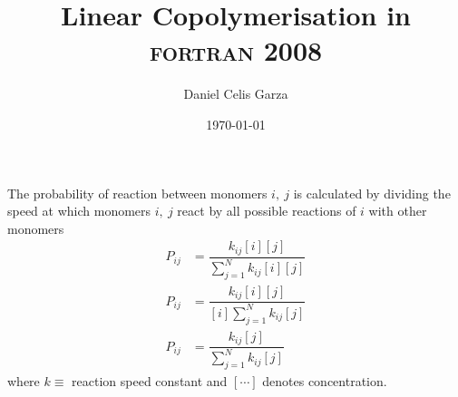 \documentclass[12pt,a4paper]{article}
\title{Linear Copolymerisation in \textsc{fortran 2008}}
\author{Daniel Celis Garza}
\date{\today}
\begin{document}
	\maketitle
	The probability of reaction between monomers $i,~j$ is calculated by dividing the speed at which monomers $i,~j$ react by all possible reactions of $i$ with other monomers
	\begin{align}
		P_{ij} &= \dfrac{k_{ij} [i][j]}{\sum\limits_{j=1}^{N} k_{ij} [i][j]} \nonumber\\
		P_{ij} &= \dfrac{k_{ij} [i][j]}{[i]\sum\limits_{j=1}^{N} k_{ij} [j]} \nonumber\\
		P_{ij} &= \dfrac{k_{ij} [j]}{\sum\limits_{j=1}^{N} k_{ij} [j]} 
	\end{align}
	where $k \equiv$ reaction speed constant and $[\cdots]$ denotes concentration.
\end{document}
